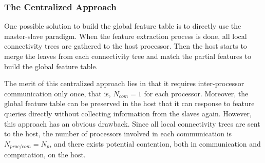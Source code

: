 % 

\subsubsection{The Centralized Approach}


One possible solution to build the global feature table is to directly use the master-slave paradigm. When the feature extraction process is done, all local connectivity trees are gathered to the host processor. Then the host starts to merge the leaves from each connectivity tree and match the partial features to build the global feature table.

The merit of this centralized approach lies in that it requires inter-processor communication only once, that is, $N_{com} = 1$ for each processor. Moreover, the global feature table can be preserved in the host that it can response to feature queries directly without collecting information from the slaves again. However, this approach has an obvious drawback. Since all local connectivity trees are sent to the host, the number of processors involved in each communication is $N_{proc/com} = N_p$, and there exists potential contention, both in communication and computation, on the host.

